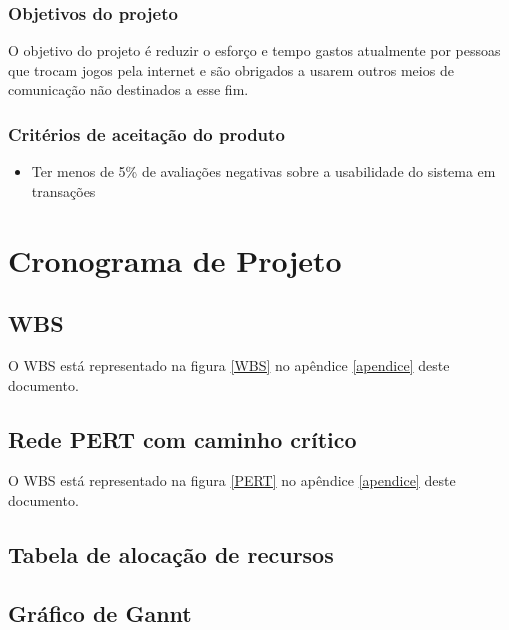 \documentclass[a4paper,11pt]{article}
\begin{document}
		\subsubsection{Objetivos do projeto}
			O objetivo do projeto é reduzir o esforço e tempo gastos atualmente por pessoas que trocam jogos pela internet e são obrigados a usarem outros meios de comunicação não destinados a esse fim.
			
		\subsubsection{Critérios de aceitação do produto}
			\begin{itemize}
				\item Ter menos de 5\% de avaliações negativas sobre a usabilidade do sistema em transações
			\end{itemize}
	
\section{Cronograma de Projeto}
	\subsection{WBS}
    	O WBS está representado na figura \ref{WBS} no apêndice \ref{apendice} deste documento.
	\subsection{Rede PERT com caminho crítico}
		O WBS está representado na figura \ref{PERT} no apêndice \ref{apendice} deste documento.
	\subsection{Tabela de alocação de recursos}
	\subsection{Gráfico de Gannt}
	
\end{document}
